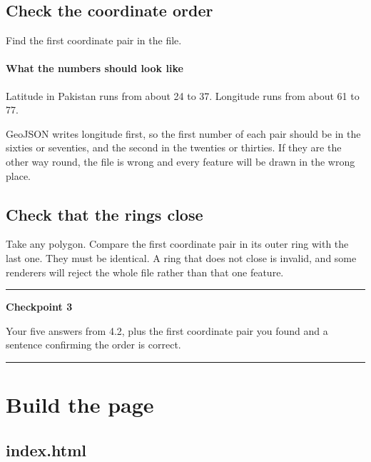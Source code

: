 \documentclass{article}
\newenvironment{keypoint}[1]
  {\par\vspace{.7em}\noindent\rule{\linewidth}{.6pt}\par\vspace{.15em}
   \noindent\textbf{#1}\par\nobreak\vspace{-.3em}}
  {\par\vspace{.15em}\noindent\rule{\linewidth}{.6pt}\par\vspace{.7em}}
\begin{document}
\subsection{Check the coordinate order}

Find the first coordinate pair in the file.

\paragraph{What the numbers should look like}
Latitude in Pakistan runs from about 24 to 37. Longitude runs from about
61 to 77.

GeoJSON writes longitude first, so the first number of each pair should
be in the sixties or seventies, and the second in the twenties or
thirties. If they are the other way round, the file is wrong and every
feature will be drawn in the wrong place.


\subsection{Check that the rings close}

Take any polygon. Compare the first coordinate pair in its outer ring
with the last one. They must be identical. A ring that does not close is
invalid, and some renderers will reject the whole file rather than that
one feature.

\begin{keypoint}{Checkpoint 3}
Your five answers from 4.2, plus the first coordinate pair you found and
a sentence confirming the order is correct.
\end{keypoint}


\section{Build the page}

\subsection{index.html}
\end{document}
